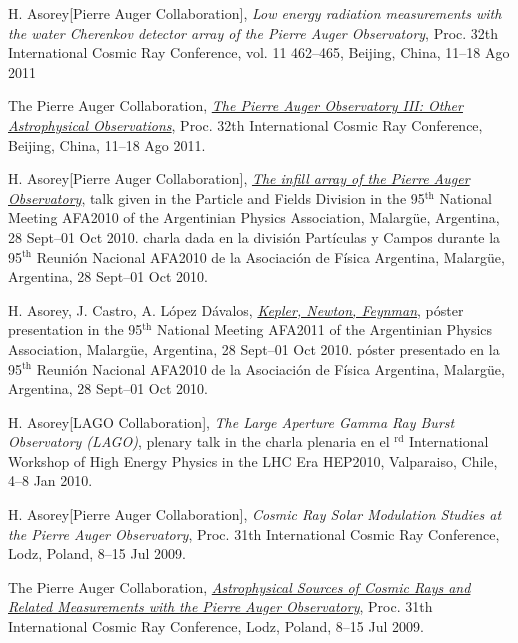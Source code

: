 \begin{etaremune}
\item {}H. Asorey[Pierre Auger Collaboration], {\emph{Low energy radiation
measurements with the water Cherenkov detector array of the Pierre Auger
Observatory}}, \en Proc. 32th International Cosmic Ray Conference, vol. 11
462--465, Beijing, China, 11--18 Ago 2011

\item {}The Pierre Auger Collaboration,
\href{http://arxiv.org/abs/1107.4805}{\emph{The Pierre Auger Observatory III:
Other Astrophysical Observations}}, \en Proc. 32th International Cosmic Ray
Conference, Beijing, China, 11--18 Ago 2011.

\item {}H. Asorey[Pierre Auger Collaboration],
\href{http://95rnf.afa.webfactional.com/tex\_files/Resumenes/DPyC/PyC\_6.pdf}{\emph{The
infill array of the Pierre Auger Observatory}}, 
\ifeng
talk given in the Particle and Fields Division in the 95$^{\mathrm{th}}$ National Meeting AFA2010 of the Argentinian Physics Association, Malargüe, Argentina, 28 Sept--01 Oct 2010.
\else
charla dada en la división Partículas y Campos durante la 95$^{\mathrm{th}}$ Reunión Nacional AFA2010 de la Asociación de Física Argentina, Malargüe, Argentina, 28 Sept--01 Oct 2010.
\fi

\item {}H. Asorey, J. Castro, A. López Dávalos,
\href{http://95rnf.afa.webfactional.com/tex\_files/Resumenes/EF/asorey.pdf}{\emph{Kepler,
Newton, Feynman}}, 
\ifeng
póster presentation in the 95$^{\mathrm{th}}$ National Meeting AFA2011 of the Argentinian Physics Association, Malargüe, Argentina, 28 Sept--01 Oct 2010.
\else
póster presentado en la 95$^{\mathrm{th}}$ Reunión Nacional AFA2010 de la Asociación de Física Argentina, Malargüe, Argentina, 28 Sept--01 Oct 2010.
\fi

\item {}H. Asorey[LAGO Collaboration], {\emph{The Large Aperture Gamma Ray Burst Observatory (LAGO)}}, 
\ifeng
plenary talk in the 
\else
charla plenaria en el 
$^{\mathrm{rd}}$ International Workshop of High Energy Physics in the LHC Era HEP2010, Valparaiso, Chile, 4--8 Jan 2010.

\item {}H. Asorey[Pierre Auger Collaboration], {\emph{Cosmic Ray Solar
Modulation Studies at the Pierre Auger Observatory}}, \en Proc. 31th
International Cosmic Ray Conference, Lodz, Poland, 8--15 Jul 2009.

\item {}The Pierre Auger Collaboration,
\href{http://arxiv.org/abs/0906.2347}{\emph{Astrophysical Sources of Cosmic
Rays and Related Measurements with the Pierre Auger Observatory}}, \en Proc.
31th International Cosmic Ray Conference, Lodz, Poland, 8--15 Jul 2009.


\end{etaremune}

